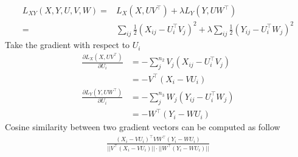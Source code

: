 \documentclass{article} %
\theoremstyle{definition}
\begin{document}
\begin{align}
L_{XY}(X,Y,U,V,W) =& L_X(X, UV^\top) + \lambda L_Y(Y, UW^\top)\\
=& \sum_{ij} \frac{1}{2} (X_{ij} - U_i^\top V_j)^2 + \lambda \sum_{ij} \frac{1}{2} (Y_{ij} - U_i^\top W_j)^2
\end{align}
Take the gradient with respect to $U_i$
\begin{align}
\frac{\partial L_X(X, UV^\top)}{\partial U_i} &= -\sum_j^{n_2} V_j(X_{ij} - U_i^\top V_j)\\
&= - V^\top(X_i - VU_i)\\
\frac{\partial L_Y(Y, UW^\top)}{\partial U_i} &= -\sum_j^{n_3} W_j(Y_{ij} - U_i^\top W_j)\\
&= - W^\top(Y_i - WU_i)
\end{align}
Cosine similarity between two gradient vectors can be computed as follow 
\begin{align}
\frac{(X_i - VU_i)^\top V W^\top(Y_i - WU_i)}{||V^\top(X_i - VU_i)||\cdot||W^\top(Y_i - WU_i)||}
\end{align}



\end{document}
